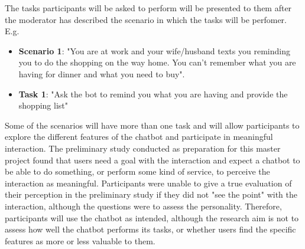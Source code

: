    The tasks participants will be asked to perform will be presented to them after the moderator has described the scenario in which the tasks will be perfomer. E.g. 
   
   \begin{itemize}
       \item \textbf{Scenario 1}: "You are at work and your wife/husband texts you reminding you to do the shopping on the way home. You can’t remember what you are having for dinner and what you need to buy".
       \item \textbf{Task 1}: "Ask the bot to remind you what you are having and provide the shopping list"
   \end{itemize}
   
   Some of the scenarios will have more than one task and will allow participants to explore the different features of the chatbot and participate in meaningful interaction. The preliminary study conducted as preparation for this master project found that users need a goal with the interaction and expect a chatbot to be able to do something, or perform some kind of service, to perceive the interaction as meaningful. Participants were unable to give a true evaluation of their perception in the preliminary study if they did not "see the point" with the interaction, although the questions were to assess the personality. Therefore, participants will use the chatbot as intended, although the research aim is not to assess how well the chatbot performs its tasks, or whether users find the specific features as more or less valuable to them.

    

   